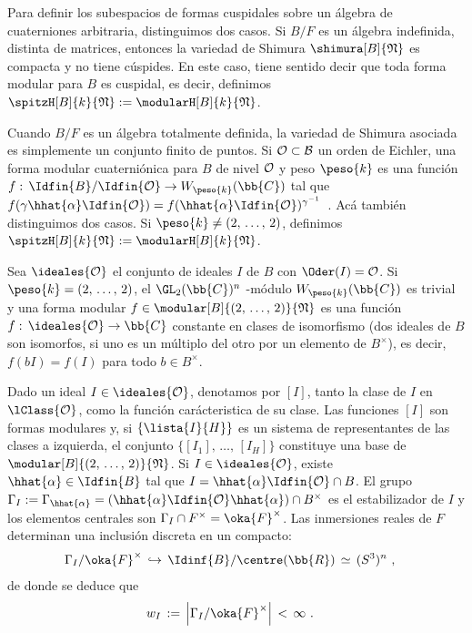 Para definir los subespacios de formas cuspidales sobre un \'{a}lgebra de
cuaterniones arbitraria, distinguimos dos casos. Si $B/F$ es un \'{a}lgebra
indefinida, distinta de matrices, entonces la variedad de Shimura
$\shimura[B]{\frak{N}}$ es compacta y no tiene c\'{u}spides. En este caso,
tiene sentido decir que toda forma modular para $B$ es cuspidal, es decir,
definimos $\spitzH[B]{k}{\frak{N}}:=\modularH[B]{k}{\frak{N}}$.

Cuando $B/F$ es un \'{a}lgebra totalmente definida, la variedad de Shimura
asociada es simplemente un conjunto finito de puntos. Si $\cal{O}\subset B$ un
orden de Eichler, una forma modular cuaterni\'{o}nica para $B$ de nivel
$\cal{O}$ y peso $\peso{k}$ es una funci\'{o}n
$f:\,\Idfin{B}/\Idfin{\cal{O}}\rightarrow W_{\peso{k}}(\bb{C})$ tal que
\begin{math}
	f(\gamma\hhat{\alpha}\Idfin{\cal{O}})=
		f(\hhat{\alpha}\Idfin{\cal{O}})^{\gamma^{-1}}
\end{math}~.
Ac\'{a} tambi\'{e}n distinguimos dos casos. Si $\peso{k}\not =(2,\,\dots,\,2)$,
definimos $\spitzH[B]{k}{\frak{N}}:=\modularH[B]{k}{\frak{N}}$.

Sea $\ideales{\cal{O}}$ el conjunto de ideales $I$ de $B$ con
$\Oder(I)=\cal{O}$. Si $\peso{k}=(2,\,\dots,\,2)$, el $\GL_{2}(\bb{C})^{n}$%
-m\'{o}dulo $W_{\peso{k}}(\bb{C})$ es trivial y una forma modular
$f\in\modular[B]{(2,\,\dots,\,2)}{\frak{N}}$ es una funci\'{o}n
$f:\,\ideales{\cal{O}}\rightarrow\bb{C}$ constante en clases de isomorfismo
(dos ideales de $B$ son isomorfos, si uno es un m\'{u}ltiplo del otro por un
elemento de $B^{\times}$), es decir, $f(bI)=f(I)$ para todo $b\in B^{\times}$.

Dado un ideal $I\in\ideales{\cal{O}}$, denotamos por $[I]$, tanto la clase
de $I$ en $\lClass{\cal{O}}$, como la funci\'{o}n car\'{a}cteristica de su
clase. Las funciones $[I]$ son formas modulares y, si $\{\lista{I}{H}\}$ es un
sistema de representantes de las clases a izquierda, el conjunto
$\{[I_{1}],\,\dots,\,[I_{H}]\}$ constituye una base de
$\modular[B]{(2,\,\dots,\,2)}{\frak{N}}$. Si $I\in\ideales{\cal{O}}$, existe
$\hhat{\alpha}\in\Idfin{B}$ tal que $I=\hhat{\alpha}\Idfin{\cal{O}}\cap B$. El
grupo
\begin{math}
	\Gamma_{I}:=\Gamma_{\hhat{\alpha}}=
		(\hhat{\alpha}\Idfin{\cal{O}}\hhat{\alpha})\cap B^{\times}
\end{math}
es el estabilizador de $I$ y los elementos centrales son
$\Gamma_{I}\cap F^{\times}=\oka{F}^{\times}$. Las inmersiones reales de $F$
determinan una inclusi\'{o}n discreta en un compacto:
\begin{align*}
	& \Gamma_{I}/\oka{F}^{\times}\,\hookrightarrow\,
		\Idinf{B}/\centre(\bb{R})
		\,\simeq\,(S^{3})^{n}
	\text{ ,}
\end{align*}
%
de donde se deduce que
\begin{align*}
	w_{I} & \,:=\, \left|\Gamma_{I}/\oka{F}^{\times}\right|\,<\,\infty
	\text{ .}
\end{align*}
%

